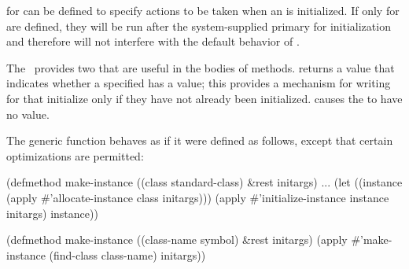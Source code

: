  for  can be defined to specify
actions to be taken when an  is initialized.  
If only  for  are defined, they will be
run after the system-supplied primary  for initialization and
therefore will not interfere with the default behavior of 
.

The \OS\ provides two  that are useful in the bodies of 
 methods.  
returns a  value that indicates whether a specified  has a
value; this provides a mechanism for writing  for
 that initialize  only if they have
not already been initialized.  
causes the  to have no value.

\endsubsection%

                      
The generic function  behaves as if it were defined as
follows, except that certain optimizations are permitted:

\code
 (defmethod make-instance ((class standard-class) &rest initargs)
   ...
   (let ((instance (apply #'allocate-instance class initargs)))
     (apply #'initialize-instance instance initargs)
     instance))

 (defmethod make-instance ((class-name symbol) &rest initargs)
   (apply #'make-instance (find-class class-name) initargs))
\endcode

                                      
